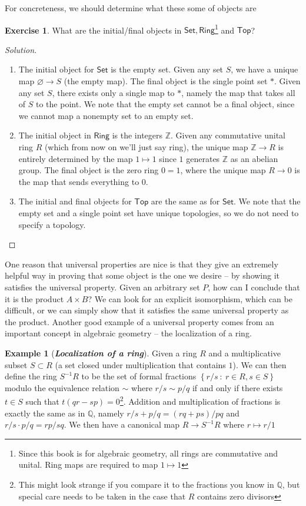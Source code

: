 \documentclass[psamsfonts]{amsart}
\theoremstyle{definition}
\newtheorem{exmp}[thm]{Example}
\newtheorem{exer}[thm]{Exercise}
\theoremstyle{remark}
\renewcommand{\emptyset}{\varnothing}
\newcommand{\ib}[1]{\textbf{\textit{#1}}}
\newcommand{\Q}{\mathbb{Q}}
\newcommand{\Z}{\mathbb{Z}}
\newcommand{\inv}{^{-1}}
\newcommand{\set}[1]{\left\lbrace #1 \right\rbrace}
\newcommand{\enumbreak}{\ \\ \vspace{-\baselineskip}}
\begin{document}
For concreteness, we should determine what these some of objects are
\begin{exer}
What are the initial/final objects in $\mathsf{Set},\mathsf{Ring}$\footnote{Since this book is for algebraic geometry, all rings are commutative and unital. Ring maps are required to map $1 \mapsto 1$} and $\mathsf{Top}$?
\end{exer}
%
\begin{proof}[Solution]\enumbreak
\begin{enumerate}
\item The initial object for $\mathsf{Set}$ is the empty set. Given any set $S$, we have a unique map $\emptyset \to S$ (the empty map). The final object is the single point set $*$. Given any set $S$, there exists only a single map to $*$, namely the map that takes all of $S$ to the point. We note that the empty set cannot be a final object, since we cannot map a nonempty set to an empty set.
\item The initial object in $\mathsf{Ring}$ is the integers $\Z$. Given any commutative unital ring $R$ (which from now on we'll just say ring), the unique map $\Z \to R$ is entirely determined by the map $1 \mapsto 1$ since $1$ generates $\Z$ as an abelian group. The final object is the zero ring $0 = 1$, where the unique map $R \to 0$ is the map that sends everything to $0$.
\item The initial and final objects for $\mathsf{Top}$ are the same as for $\mathsf{Set}$. We note that the empty set and a single point set have unique topologies, so we do not need to specify a topology.
\end{enumerate}
\end{proof}
One reason that universal properties are nice is that they give an extremely helpful way in proving that some object is the one we desire -- by showing it satisfies the universal property. Given an arbitrary set $P$, how can I conclude that it is the product $A \times B$? We can look for an explicit isomorphism, which can be difficult, or we can simply show that it satisfies the same universal property as the product. Another good example of a universal property comes from an important concept in algebraic geometry -- the localization of a ring.
\begin{exmp}[\ib{Localization of a ring}]
Given a ring $R$ and a multiplicative subset $S \subset R$ (a set closed under multiplication that contains $1$). We can then define the ring $S\inv R$ to be the set of formal fractions $\set{r/s ~:~ r \in R, s \in S}$ modulo the equivalence relation $\sim$ where $r/s \sim p/q$ if and only if there exists $t \in S$ such that $t(qr - sp) = 0$\footnote{This might look strange if you compare it to the fractions you know in $\Q$, but special care needs to be taken in the case that $R$ contains zero divisors}. Addition and multiplication of fractions is exactly the same as in $\Q$, namely $r/s + p/q = (rq + ps)/pq$ and $r/s \cdot p/q = rp/sq$. We then have a canonical map $R \to S\inv R$ where $r \mapsto r/1$
\end{exmp}
\end{document}
